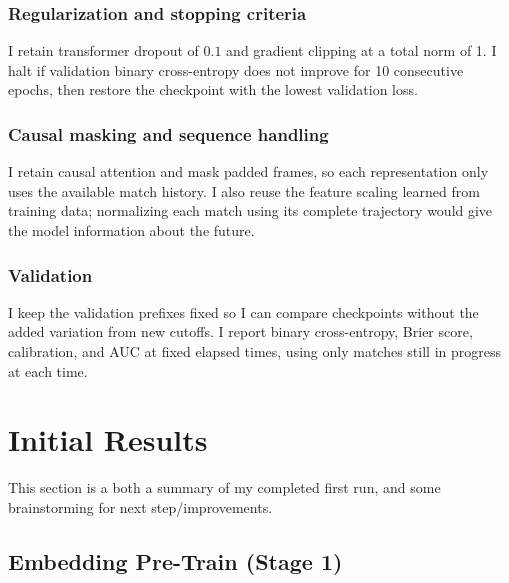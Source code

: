 \documentclass[11pt]{article}
\begin{document}
    \subsubsection{Regularization and stopping criteria}
        I retain transformer dropout of $0.1$ and gradient clipping at a total norm of 1. I halt if validation binary cross-entropy does not improve for 10 consecutive epochs, then restore the checkpoint with the lowest validation loss.

    \subsubsection{Causal masking and sequence handling}
        I retain causal attention and mask padded frames, so each representation only uses the available match history. I also reuse the feature scaling learned from training data; normalizing each match using its complete trajectory would give the model information about the future.

    \subsubsection{Validation}
        I keep the validation prefixes fixed so I can compare checkpoints without the added variation from new cutoffs. I report binary cross-entropy, Brier score, calibration, and AUC at fixed elapsed times, using only matches still in progress at each time.



\section{Initial Results}
    This section is a both a summary of my completed first run, and some brainstorming for next step/improvements.

\subsection{Embedding Pre-Train (Stage 1)}
\end{document}
